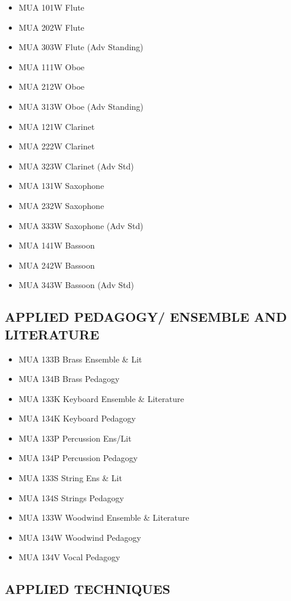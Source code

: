 \documentclass[
  letterpaper,
]{scrbook}
\providecommand{\tightlist}{%
  \setlength{\itemsep}{0pt}\setlength{\parskip}{0pt}}
\begin{document}
\begin{itemize}
\tightlist
\item
  MUA 101W Flute
\item
  MUA 202W Flute
\item
  MUA 303W Flute (Adv Standing)
\item
  MUA 111W Oboe
\item
  MUA 212W Oboe
\item
  MUA 313W Oboe (Adv Standing)
\item
  MUA 121W Clarinet
\item
  MUA 222W Clarinet
\item
  MUA 323W Clarinet (Adv Std)
\item
  MUA 131W Saxophone
\item
  MUA 232W Saxophone
\item
  MUA 333W Saxophone (Adv Std)
\item
  MUA 141W Bassoon
\item
  MUA 242W Bassoon
\item
  MUA 343W Bassoon (Adv Std)
\end{itemize}

\subsection{APPLIED PEDAGOGY/ ENSEMBLE AND
LITERATURE}\label{applied-pedagogy-ensemble-and-literature}

\begin{itemize}
\tightlist
\item
  MUA 133B Brass Ensemble \& Lit
\item
  MUA 134B Brass Pedagogy
\item
  MUA 133K Keyboard Ensemble \& Literature
\item
  MUA 134K Keyboard Pedagogy
\item
  MUA 133P Percussion Ens/Lit
\item
  MUA 134P Percussion Pedagogy
\item
  MUA 133S String Ens \& Lit
\item
  MUA 134S Strings Pedagogy
\item
  MUA 133W Woodwind Ensemble \& Literature
\item
  MUA 134W Woodwind Pedagogy
\item
  MUA 134V Vocal Pedagogy
\end{itemize}

\subsection{APPLIED TECHNIQUES}\label{applied-techniques}
\end{document}
